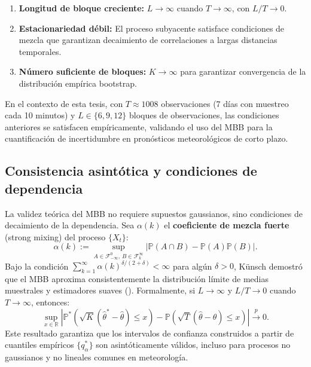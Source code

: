 \documentclass[
  spanish,
  us-letterpaper,
]{scrreprt}
\providecommand{\tightlist}{%
  \setlength{\itemsep}{0pt}\setlength{\parskip}{0pt}}
\numberwithin{equation}{section}
\begin{document}
\begin{enumerate}
\def\labelenumi{\arabic{enumi}.}
\tightlist
\item
  \textbf{Longitud de bloque creciente:} \(L \to \infty\) cuando
  \(T \to \infty\), con \(L/T \to 0\).
\item
  \textbf{Estacionariedad débil:} El proceso subyacente satisface
  condiciones de mezcla que garantizan decaimiento de correlaciones a
  largas distancias temporales.
\item
  \textbf{Número suficiente de bloques:} \(K \to \infty\) para
  garantizar convergencia de la distribución empírica bootstrap.
\end{enumerate}

En el contexto de esta tesis, con \(T \approx 1008\) observaciones (7
días con muestreo cada 10 minutos) y \(L \in \{6, 9, 12\}\) bloques de
observaciones, las condiciones anteriores se satisfacen empíricamente,
validando el uso del MBB para la cuantificación de incertidumbre en
pronósticos meteorológicos de corto plazo.

\subsection{Consistencia asintótica y condiciones de
dependencia}\label{consistencia-asintuxf3tica-y-condiciones-de-dependencia}

La validez teórica del MBB no requiere supuestos gaussianos, sino
condiciones de decaimiento de la dependencia. Sea \(\alpha(k)\) el
\textbf{coeficiente de mezcla fuerte} (strong mixing) del proceso
\(\{X_t\}\): \[
\alpha(k) := \sup_{A \in \mathcal{F}_{-\infty}^0, \, B \in \mathcal{F}_k^\infty} \left| \mathbb{P}(A \cap B) - \mathbb{P}(A)\mathbb{P}(B) \right|.
\] Bajo la condición
\(\sum_{k=1}^\infty \alpha(k)^{\delta/(2+\delta)} < \infty\) para algún
\(\delta > 0\), Künsch demostró que el MBB aproxima consistentemente la
distribución límite de medias muestrales y estimadores suaves
(). Formalmente, si
\(L \to \infty\) y \(L/T \to 0\) cuando \(T \to \infty\), entonces: \[
\sup_{x \in \mathbb{R}} \left| \mathbb{P}^*\left( \sqrt{K}(\hat{\theta}^* - \hat{\theta}) \leq x \right) - \mathbb{P}\left( \sqrt{T}(\hat{\theta} - \theta) \leq x \right) \right| \xrightarrow{p} 0.
\] Este resultado garantiza que los intervalos de confianza construidos
a partir de cuantiles empíricos \(\{q_\alpha^*\}\) son asintóticamente
válidos, incluso para procesos no gaussianos y no lineales comunes en
meteorología.
\end{document}
